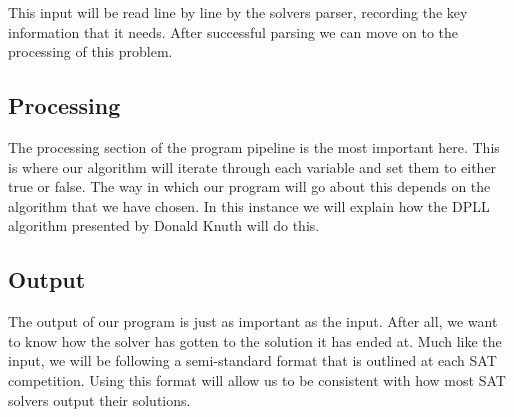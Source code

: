 \documentclass{article}
\begin{document}
This input will be read line by line by the solvers parser, recording the key information that it
needs. After successful parsing we can move on to the processing of this problem.

\subsection{Processing}
The processing section of the program pipeline is the most important here. This is where our
algorithm will iterate through each variable and set them to either true or false. The way in which
our program will go about this depends on the algorithm that we have chosen. In this instance we
will explain how the DPLL algorithm presented by Donald Knuth will do this.


\subsection{Output}

The output of our program is just as important as the input. After all, we want to know how the
solver has gotten to the solution it has ended at. Much like the input, we will be following a
semi-standard format that is outlined at each SAT competition. Using this format will allow us to be
consistent with how most SAT solvers output their solutions.
\end{document}
